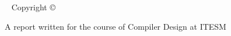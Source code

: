 \begin{fullwidth}
~\vfill
\thispagestyle{empty}
\setlength{\parindent}{0pt}
\setlength{\parskip}{\baselineskip}
Copyright \copyright\ \the\year %

\par \thanklessauthor

\par{}



\par A report written for the course of Compiler Design at ITESM

\end{fullwidth}

